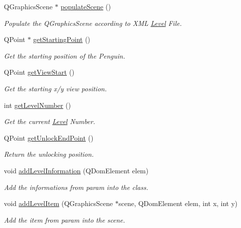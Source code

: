 \begin{DoxyCompactItemize}
\item 
Q\+Graphics\+Scene $\ast$ \hyperlink{class_level2_a50807da02e4e94065c18999374341508}{populate\+Scene} ()
\begin{DoxyCompactList}\small\item\em Populate the Q\+Graphics\+Scene according to X\+M\+L \hyperlink{class_level}{Level} File. \end{DoxyCompactList}\item 
Q\+Point $\ast$ \hyperlink{class_level2_a57e80746dcfba5f73ed1b4f84d5b1a76}{get\+Starting\+Point} ()
\begin{DoxyCompactList}\small\item\em Get the starting position of the Penguin. \end{DoxyCompactList}\item 
Q\+Point \hyperlink{class_level2_ae00d67c53b25def82750bad0e296d1ef}{get\+View\+Start} ()
\begin{DoxyCompactList}\small\item\em Get the starting x/y view position. \end{DoxyCompactList}\item 
int \hyperlink{class_level2_afc7097e892ccfb17fcc8846c9fda4910}{get\+Level\+Number} ()
\begin{DoxyCompactList}\small\item\em Get the current \hyperlink{class_level}{Level} Number. \end{DoxyCompactList}\item 
Q\+Point \hyperlink{class_level2_a7e8c1628b703886e61a00f755dc2038b}{get\+Unlock\+End\+Point} ()
\begin{DoxyCompactList}\small\item\em Return the unlocking position. \end{DoxyCompactList}\item 
void \hyperlink{class_level2_a6c6c7c86949a63afde397fdd7c76b01c}{add\+Level\+Information} (Q\+Dom\+Element elem)
\begin{DoxyCompactList}\small\item\em Add the informations from param into the class. \end{DoxyCompactList}\item 
void \hyperlink{class_level2_a87a8120e0107e8d7029480ff0e473b05}{add\+Level\+Item} (Q\+Graphics\+Scene $\ast$scene, Q\+Dom\+Element elem, int x, int y)
\begin{DoxyCompactList}\small\item\em Add the item from param into the scene. \end{DoxyCompactList}\end{DoxyCompactItemize}


